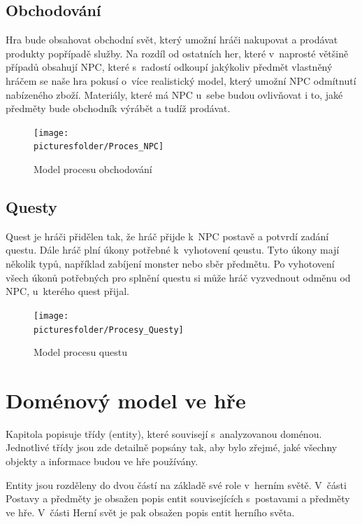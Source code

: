 \documentclass[12pt,a4paper]{article}
\def\picturesfolder{obrazky}
\begin{document}
\subsection{Obchodování} \label{procesy:obchod}
Hra bude obsahovat obchodní svět, který umožní hráči nakupovat a prodávat
produkty popřípadě služby. Na rozdíl od ostatních her, které v~naprosté většině
případů obsahují NPC, které s~radostí odkoupí jakýkoliv předmět vlastněný hráčem
se naše hra pokusí o~více realistický model, který umožní NPC odmítnutí
nabízeného zboží. Materiály, které má NPC u~sebe budou ovlivňovat i to, jaké
předměty bude obchodník výrábět a tudíž prodávat.

\begin{figure}
\begin{center}
\texttt{[image: \\picturesfolder/Proces\_NPC]}
  \caption{Model procesu obchodování}
  \label{process:trade}
\end{center}
\end{figure}

\subsection{Questy} \label{procesy:questy}
Quest je hráči přidělen tak, že hráč přijde k~NPC postavě a potvrdí zadání
questu. Dále hráč plní úkony potřebné k~vyhotovení qeustu. Tyto úkony mají
několik typů, například zabíjení monster nebo sběr předmětu. Po vyhotovení všech
úkonů potřebných pro splnění questu si může hráč vyzvednout odměnu od NPC,
u~kterého quest přijal.

\begin{figure}
\begin{center}
\texttt{[image: \\picturesfolder/Procesy\_Questy]}
  \caption{Model procesu questu}
  \label{process:quest}
\end{center}
\end{figure}



\section{Doménový model ve hře}
Kapitola popisuje třídy (entity), které souvisejí s~analyzovanou doménou.
Jednotlivé třídy jsou zde detailně popsány tak, aby bylo zřejmé, jaké všechny
objekty a informace budou ve hře používány.

Entity jsou rozděleny do dvou částí na základě své role v~herním světě. V~části
Postavy a předměty je obsažen popis entit souvisejících s~postavami a předměty
ve hře.  V~části Herní svět je pak obsažen popis entit herního světa.
\end{document}
